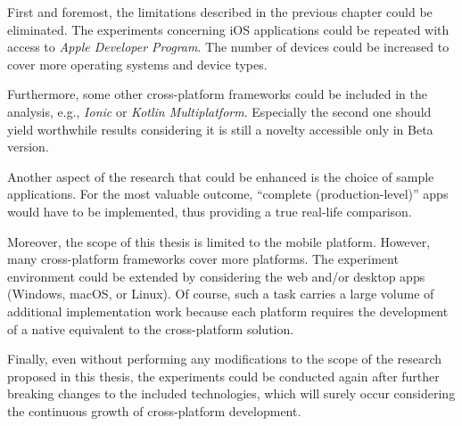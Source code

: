 First and foremost, the limitations described in the previous chapter could be eliminated. The experiments concerning iOS applications could be repeated with access to \emph{Apple Developer Program}. The number of devices could be increased to cover more operating systems and device types.

Furthermore, some other cross-platform frameworks could be included in the analysis, e.g., \emph{Ionic} or \emph{Kotlin Multiplatform}. Especially the second one should yield worthwhile results considering it is still a novelty accessible only in Beta version.

Another aspect of the research that could be enhanced is the choice of sample applications. For the most valuable outcome, ``complete (production-level)'' apps would have to be implemented, thus providing a true real-life comparison.

Moreover, the scope of this thesis is limited to the mobile platform. However, many cross-platform frameworks cover more platforms. The experiment environment could be extended by considering the web and/or desktop apps (Windows, macOS, or Linux). Of course, such a task carries a large volume of additional implementation work because each platform requires the development of a native equivalent to the cross-platform solution.

Finally, even without performing any modifications to the scope of the research proposed in this thesis, the experiments could be conducted again after further breaking changes to the included technologies, which will surely occur considering the continuous growth of cross-platform development.

\clearpage
